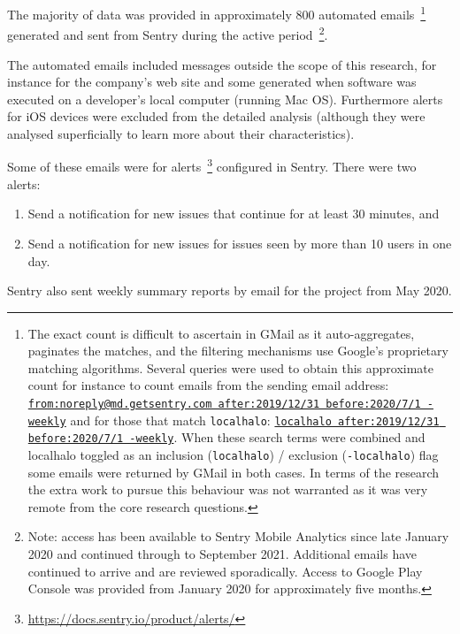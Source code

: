 The majority of data was provided in approximately 800 automated emails~\footnote{The exact count is difficult to ascertain in GMail as it auto-aggregates, paginates the matches, and the filtering mechanisms use Google's proprietary matching algorithms. Several queries were used to obtain this approximate count for instance to count emails from the sending email address: \href{https://mail.google.com/mail/u/0/\#search/from\%3Anoreply\%40md.getsentry.com++after\%3A2019\%2F12\%2F31+before\%3A2020\%2F7\%2F1+-weekly}{\texttt{from:noreply@md.getsentry.com  after:2019/12/31 before:2020/7/1 -weekly}} and for those that match \texttt{localhalo}: \href{https://mail.google.com/mail/u/0/\#search/localhalo++after\%3A2019\%2F12\%2F31+before\%3A2020\%2F7\%2F1+-weekly}{\texttt{localhalo  after:2019/12/31 before:2020/7/1 -weekly}}. When these search terms were combined and localhalo toggled as an inclusion (\texttt{localhalo}) / exclusion (\texttt{-localhalo}) flag some emails were returned by GMail in both cases. In terms of the research the extra work to pursue this behaviour was not warranted as it was very remote from the core research questions.} generated and sent from Sentry during the active period~\footnote{Note: access has been available to Sentry Mobile Analytics since late January 2020 and continued through to September 2021. %
Additional emails have continued to arrive and are reviewed sporadically.  Access to Google Play Console was provided from  January 2020 for approximately five months.}. 

The automated emails included messages outside the scope of this research, for instance for the company's web site and some generated when software was executed on a developer's local computer (running Mac OS). Furthermore alerts for iOS devices were excluded from the detailed analysis (although they were analysed superficially to learn more about their characteristics). 


Some of these emails were for alerts~\footnote{\url{https://docs.sentry.io/product/alerts/}} configured in Sentry. There were two alerts: 
\begin{enumerate}
    \itemsep0em
    \item Send a notification for new issues that continue for at least 30 minutes, and
    \item Send a notification for new issues for issues seen by more than 10 users in one day.
\end{enumerate}  
Sentry also sent weekly summary reports by email for the project from  May 2020.


